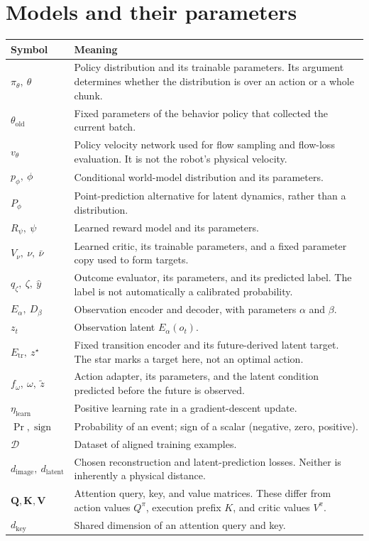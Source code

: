 \section*{Models and their parameters}
\begin{longtable}{@{}p{40mm}p{116mm}@{}}
\toprule Symbol & Meaning\\\midrule\endhead
$\pi_\theta,\ \theta$ & Policy distribution and its trainable parameters. Its argument determines whether the distribution is over an action or a whole chunk.\\
$\theta_{\mathrm{old}}$ & Fixed parameters of the behavior policy that collected the current batch.\\
$v_\theta$ & Policy velocity network used for flow sampling and flow-loss evaluation. It is not the robot's physical velocity.\\
$p_\phi,\ \phi$ & Conditional world-model distribution and its parameters.\\
$P_\phi$ & Point-prediction alternative for latent dynamics, rather than a distribution.\\
$R_\psi,\ \psi$ & Learned reward model and its parameters.\\
$V_\nu,\ \nu,\ \bar\nu$ & Learned critic, its trainable parameters, and a fixed parameter copy used to form targets.\\
$q_\zeta,\ \zeta,\ \widehat y$ & Outcome evaluator, its parameters, and its predicted label. The label is not automatically a calibrated probability.\\
$E_\alpha,\ D_\beta$ & Observation encoder and decoder, with parameters $\alpha$ and $\beta$.\\
$z_t$ & Observation latent $E_\alpha(o_t)$.\\
$E_{\mathrm{tr}},\ z^\star$ & Fixed transition encoder and its future-derived latent target. The star marks a target here, not an optimal action.\\
$f_\omega,\ \omega,\ \widetilde z$ & Action adapter, its parameters, and the latent condition predicted before the future is observed.\\
$\eta_{\mathrm{learn}}$ & Positive learning rate in a gradient-descent update.\\
$\Pr,\operatorname{sign}$ & Probability of an event; sign of a scalar (negative, zero, positive).\\
$\mathcal D$ & Dataset of aligned training examples.\\
$d_{\mathrm{image}},\ d_{\mathrm{latent}}$ & Chosen reconstruction and latent-prediction losses. Neither is inherently a physical distance.\\
$\mathbf Q,\mathbf K,\mathbf V$ & Attention query, key, and value matrices. These differ from action values $Q^\pi$, execution prefix $K$, and critic values $V^\pi$.\\
$d_{\mathrm{key}}$ & Shared dimension of an attention query and key.\\
\bottomrule
\end{longtable}


